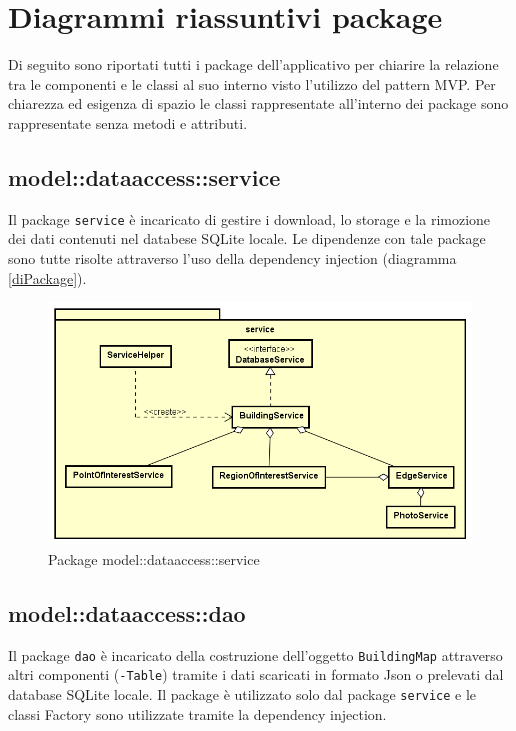 \documentclass[../DefinizioneDiProdotto.tex,lanscape]{subfiles}
\begin{document}
\section{Diagrammi riassuntivi package}
	Di seguito sono riportati tutti i package dell'applicativo per chiarire la relazione tra le componenti e le classi al suo interno visto l'utilizzo del pattern MVP. Per chiarezza ed esigenza di spazio le classi rappresentate all'interno dei package sono rappresentate senza metodi e attributi.

	

	\subsection{model::dataaccess::service}
		Il package \verb|service| è incaricato di gestire i download, lo storage e la rimozione dei dati contenuti nel databese SQLite locale. Le dipendenze con tale package sono tutte risolte attraverso l'uso della dependency injection (diagramma \ref{diPackage}).

\begin{figure}[h]
	\centering
	\includegraphics[scale=0.6]{img/RelationPackage/service}
	\caption{Package model::dataaccess::service}
	\label{servicePackage}
\end{figure}


\newpage
	\subsection{model::dataaccess::dao}
		Il package \verb|dao| è incaricato della costruzione dell'oggetto \verb|BuildingMap| attraverso altri componenti (\verb|-Table|) tramite i dati scaricati in formato Json o prelevati dal database SQLite locale. Il package è utilizzato solo dal package \verb|service| e le classi Factory sono utilizzate tramite la dependency injection.
\end{document}
